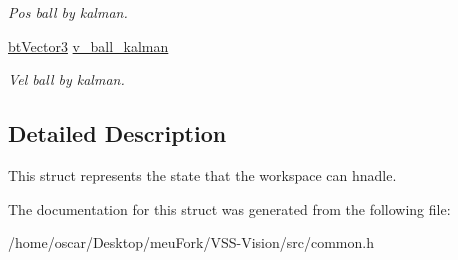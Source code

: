 \begin{DoxyCompactItemize}
\begin{DoxyCompactList}\small\item\em Pos ball by kalman. \end{DoxyCompactList}\item 
\hypertarget{structcommon_1_1State_adc2d51526dffd90f889324c90fa082a0}{\hyperlink{structcommon_1_1btVector3}{bt\-Vector3} \hyperlink{structcommon_1_1State_adc2d51526dffd90f889324c90fa082a0}{v\-\_\-ball\-\_\-kalman}}\label{structcommon_1_1State_adc2d51526dffd90f889324c90fa082a0}

\begin{DoxyCompactList}\small\item\em Vel ball by kalman. \end{DoxyCompactList}\end{DoxyCompactItemize}


\subsection{Detailed Description}
This struct represents the state that the workspace can hnadle. 

The documentation for this struct was generated from the following file\-:\begin{DoxyCompactItemize}
\item 
/home/oscar/\-Desktop/meu\-Fork/\-V\-S\-S-\/\-Vision/src/common.\-h\end{DoxyCompactItemize}
